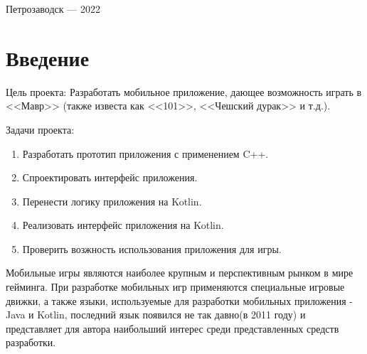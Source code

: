 \documentclass[a4paper,12pt]{article}
\begin{document}
\vfill

\begin{center}
\large
    Петрозаводск --- 2022
\end{center}



\newpage

\tableofcontents





\newpage
\section*{Введение}

Цель проекта: Разработать мобильное приложение, дающее возможность играть в <<Мавр>> (также известа как <<101>>, <<Чешский дурак>> и т.д.).

Задачи проекта: 
\begin{enumerate} 
    \item Разработать прототип приложения с применением C++.
    \item Спроектировать интерфейс приложения.
    \item Перенести логику приложения на Kotlin.
    \item Реализовать интерфейс приложения на Kotlin.
    \item Проверить возжность использования приложения для игры.
\end{enumerate}

Мобильные игры являются наиболее крупным и перспективным рынком в мире гейминга. При разработке мобильных игр применяются специальные игровые движки, а также языки, используемые для разработки мобильных приложения - Java и Kotlin, последний язык появился не так давно(в 2011 году) и представляет для автора наибольший интерес среди представленных средств разработки.
\end{document}
